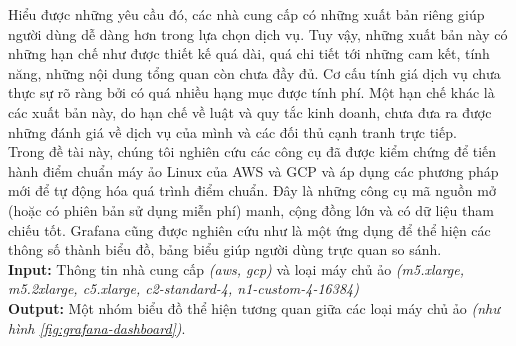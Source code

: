 \documentclass{IEEEtran}
\begin{document}
Hiểu được những yêu cầu đó, các nhà cung cấp có những xuất bản riêng \cite{geewax2018google, wittig2018amazon} giúp người dùng dễ dàng hơn trong lựa chọn dịch vụ. Tuy vậy, những xuất bản này có những hạn chế như được thiết kế quá dài, quá chi tiết tới những cam kết, tính năng, những nội dung tổng quan còn chưa đầy đủ. Cơ cấu tính giá dịch vụ chưa thực sự rõ ràng bởi có quá nhiều hạng mục được tính phí. Một hạn chế khác là các xuất bản này, do hạn chế về luật và quy tắc kinh doanh, chưa đưa ra được những đánh giá về dịch vụ của mình và các đối thủ cạnh tranh trực tiếp. \\

Trong đề tài này, chúng tôi nghiên cứu các công cụ đã được kiểm chứng\cite*{Passmark2023Performancetest, Axboe2023fio, Iozone2016Benchmark, OOKLA2023Speedtest} để tiến hành điểm chuẩn máy ảo Linux của AWS và GCP và áp dụng các phương pháp mới để tự động hóa quá trình điểm chuẩn. Đây là những công cụ mã nguồn mở (hoặc có phiên bản sử dụng miễn phí) manh, cộng đồng lớn và có dữ liệu tham chiếu tốt. Grafana\cite{chakraborty2021grafana} cũng được nghiên cứu như là một ứng dụng để thể hiện các thông số thành biểu đồ, bảng biểu giúp người dùng trực quan so sánh. \\

\textbf{Input:} Thông tin nhà cung cấp \textit{(aws, gcp)} và loại máy chủ ảo \textit{(m5.xlarge, m5.2xlarge, c5.xlarge, c2-standard-4, n1-custom-4-16384)}\\

\textbf{Output:} Một nhóm biểu đồ thể hiện tương quan giữa các loại máy chủ ảo \textit{(như hình \ref{fig:grafana-dashboard})}. \\
\end{document}
